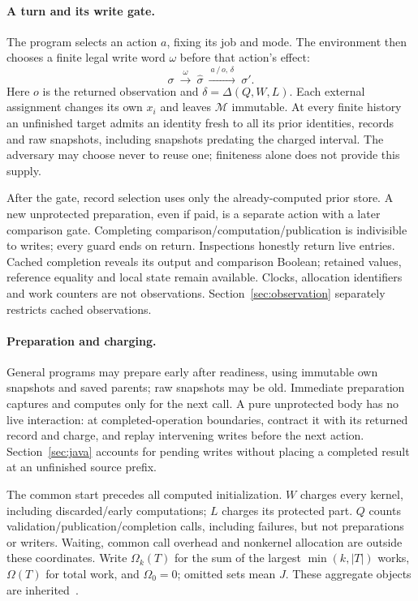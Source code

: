 \documentclass[acmsmall,screen,review,anonymous]{acmart}
\begin{document}
\paragraph{A turn and its write gate.}
The program selects an action $a$, fixing its job and mode. The environment then chooses a finite legal write word $\omega$ before that action's effect:
\[
 \sigma\ \xrightarrow{\ \omega\ }\ \widehat\sigma
 \ \xrightarrow{\ a\,/\,o,\,\delta\ }\ \sigma'.
\]
Here $o$ is the returned observation and $\delta=\Delta(Q,W,L)$. Each external assignment changes its own $x_i$ and leaves $\mathcal M$ immutable. At every finite history an unfinished target admits an identity fresh to all its prior identities, records and raw snapshots, including snapshots predating the charged interval. The adversary may choose never to reuse one; finiteness alone does not provide this supply.

After the gate, record selection uses only the already-computed prior store. A new unprotected preparation, even if paid, is a separate action with a later comparison gate. Completing comparison/computation/publication is indivisible to writes; every guard ends on return. Inspections honestly return live entries. Cached completion reveals its output and comparison Boolean; retained values, reference equality and local state remain available. Clocks, allocation identifiers and work counters are not observations. Section~\ref{sec:observation} separately restricts cached observations.

\paragraph{Preparation and charging.}
General programs may prepare early after readiness, using immutable own snapshots and saved parents; raw snapshots may be old. Immediate preparation captures and computes only for the next call. A pure unprotected body has no live interaction: at completed-operation boundaries, contract it with its returned record and charge, and replay intervening writes before the next action. Section~\ref{sec:java} accounts for pending writes without placing a completed result at an unfinished source prefix.

The common start precedes all computed initialization. $W$ charges every kernel, including discarded/early computations; $L$ charges its protected part. $Q$ counts validation/publication/completion calls, including failures, but not preparations or writers. Waiting, common call overhead and nonkernel allocation are outside these coordinates. Write $\Omega_k(T)$ for the sum of the largest $\min(k,|T|)$ works, $\Omega(T)$ for total work, and $\Omega_0=0$; omitted sets mean $J$. These aggregate objects are inherited~\cite{bertsimas,federgruen}.
\end{document}
